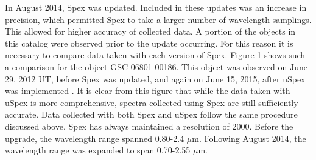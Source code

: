 In August 2014, Spex was updated.  Included in these updates was an increase in precision, which permitted Spex to take a larger number of  wavelength samplings.  This allowed for higher accuracy of collected data.  A portion of the objects in this catalog were observed prior to the update occurring.  For this reason it is necessary to compare data taken with each version of Spex. Figure 1 shows such a comparison for the object GSC 06801-00186.  This object was observed on June 29, 2012 UT, before Spex was updated, and again on June 15, 2015, after uSpex was implemented \cite{Spextool_Manual_Cushing_2015}.  It is clear from this figure that while the data taken with uSpex is more comprehensive, spectra collected using Spex are still sufficiently accurate.  Data collected with both Spex and uSpex follow the same procedure discussed above.  Spex has always maintained a resolution of 2000.  Before the upgrade, the wavelength range spanned 0.80-2.4 $\mu$m.  Following August 2014, the wavelength range was expanded to span 0.70-2.55 $\mu$m.\\

